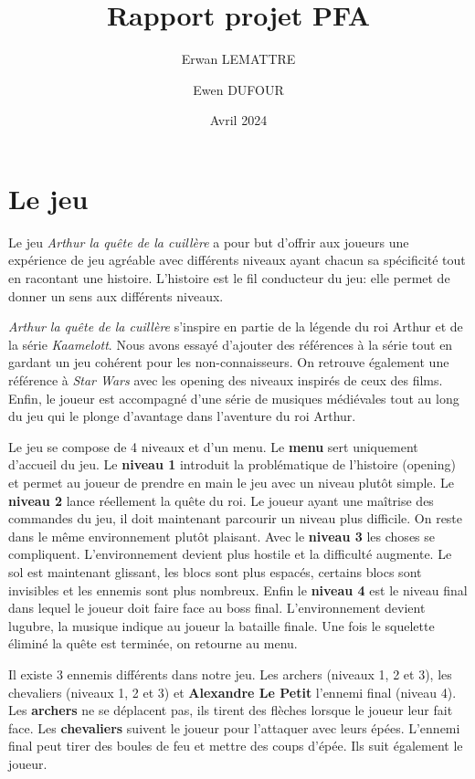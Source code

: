 \documentclass{article}
\title{Rapport projet PFA}
\author{Erwan LEMATTRE \and Ewen DUFOUR}
\date{Avril 2024}
\begin{document}
\maketitle

\newpage

\section{Le jeu}
Le jeu \textit{Arthur la quête de la cuillère} a pour but d'offrir aux joueurs une expérience 
de jeu agréable avec différents niveaux ayant chacun sa spécificité tout en racontant une histoire.
L'histoire est le fil conducteur du jeu: elle permet de donner un sens aux différents niveaux.

\textit{Arthur la quête de la cuillère} s'inspire en partie de la légende du roi Arthur et
 de la série \textit{Kaamelott}. Nous avons essayé d'ajouter des références à la série tout 
en gardant un jeu cohérent pour les non-connaisseurs. On retrouve également une référence 
à \textit{Star Wars} avec les opening des niveaux inspirés de ceux des films. Enfin, 
le joueur est accompagné d'une série de musiques médiévales tout au long du jeu qui le 
plonge d'avantage dans l'aventure du roi Arthur.

Le jeu se compose de 4 niveaux et d'un menu. Le \textbf{menu} sert uniquement d'accueil du jeu.
Le \textbf{niveau 1} introduit la problématique de l'histoire (opening) et permet au joueur de 
prendre en main le jeu avec un niveau plutôt simple. Le \textbf{niveau 2} lance réellement la 
quête du roi. Le joueur ayant une maîtrise des commandes du jeu, il doit maintenant parcourir un 
niveau plus difficile. On reste dans le même environnement plutôt plaisant. Avec le \textbf{niveau 3} 
les choses se compliquent. L'environnement devient plus hostile et la difficulté augmente. Le sol 
est maintenant glissant, les blocs sont plus espacés, certains blocs sont invisibles et les ennemis sont 
plus nombreux. Enfin le \textbf{niveau 4} est le niveau final dans lequel le joueur doit faire face 
au boss final. L'environnement devient lugubre, la musique indique au joueur la bataille finale.
Une fois le squelette éliminé la quête est terminée, on retourne au menu.

Il existe 3 ennemis différents dans notre jeu. Les archers (niveaux 1, 2 et 3), les chevaliers (niveaux 1, 2 et 3)
et \textbf{Alexandre Le Petit} l'ennemi final (niveau 4). Les \textbf{archers} ne se déplacent pas, ils tirent des 
flèches lorsque le joueur leur fait face. Les \textbf{chevaliers} suivent le joueur pour l'attaquer avec leurs 
épées. L'ennemi final peut tirer des boules de feu et mettre des coups d'épée. Ils suit également le joueur.
\end{document}
